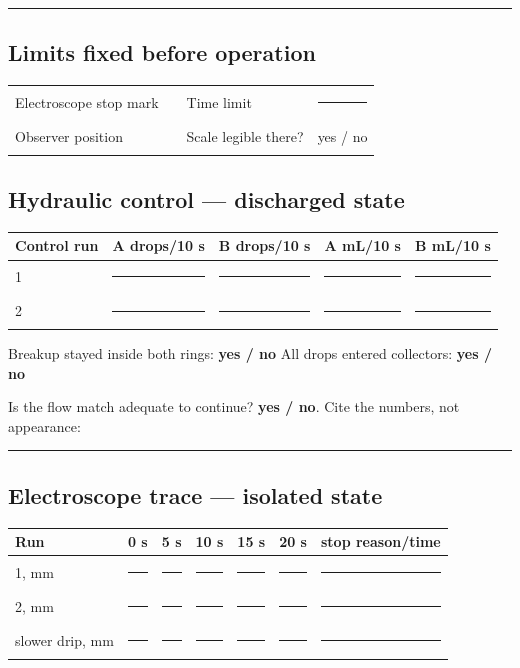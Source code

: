 \vspace{1.0cm}
\hrule

\subsection*{Limits fixed before operation}
\noindent
\begin{tabularx}{\linewidth}{@{}p{.25\linewidth}Xp{.25\linewidth}X@{}}
Electroscope stop mark & \rule{2.4cm}{.3pt} &
Time limit & \rule{2.4cm}{.3pt}\\[5pt]
Observer position & \rule{2.4cm}{.3pt} &
Scale legible there? & yes / no\\
\end{tabularx}

\subsection*{Hydraulic control --- discharged state}
\begin{center}
\begin{tabular}{@{}lrrrr@{}}
\toprule
Control run & A drops/10 s & B drops/10 s & A mL/10 s & B mL/10 s\\
\midrule
1 & \rule{1.45cm}{.3pt} & \rule{1.45cm}{.3pt} &
\rule{1.35cm}{.3pt} & \rule{1.35cm}{.3pt}\\[4pt]
2 & \rule{1.45cm}{.3pt} & \rule{1.45cm}{.3pt} &
\rule{1.35cm}{.3pt} & \rule{1.35cm}{.3pt}\\
\bottomrule
\end{tabular}
\end{center}

\noindent Breakup stayed inside both rings: \textbf{yes / no}\hfill
All drops entered collectors: \textbf{yes / no}

\medskip
\noindent Is the flow match adequate to continue? \textbf{yes / no}. Cite the
numbers, not appearance:

\vspace{.75cm}
\hrule

\subsection*{Electroscope trace --- isolated state}
\begin{center}
\begin{tabular}{@{}lrrrrrr@{}}
\toprule
Run & 0 s & 5 s & 10 s & 15 s & 20 s & stop reason/time\\
\midrule
1, mm & \rule{1.0cm}{.3pt} & \rule{1.0cm}{.3pt} &
\rule{1.0cm}{.3pt} & \rule{1.0cm}{.3pt} & \rule{1.0cm}{.3pt} &
\rule{2.2cm}{.3pt}\\[4pt]
2, mm & \rule{1.0cm}{.3pt} & \rule{1.0cm}{.3pt} &
\rule{1.0cm}{.3pt} & \rule{1.0cm}{.3pt} & \rule{1.0cm}{.3pt} &
\rule{2.2cm}{.3pt}\\[4pt]
slower drip, mm & \rule{1.0cm}{.3pt} & \rule{1.0cm}{.3pt} &
\rule{1.0cm}{.3pt} & \rule{1.0cm}{.3pt} & \rule{1.0cm}{.3pt} &
\rule{2.2cm}{.3pt}\\
\bottomrule
\end{tabular}
\end{center}

